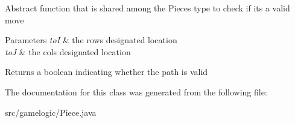 Abstract function that is shared among the Pieces type to check if it\textquotesingle{}s a valid move 
\begin{DoxyParams}{Parameters}
{\em toI} & the row\textquotesingle{}s designated location \\
\hline
{\em toJ} & the col\textquotesingle{}s designated location \\
\hline
\end{DoxyParams}
\begin{DoxyReturn}{Returns}
a boolean indicating whether the path is valid 
\end{DoxyReturn}


The documentation for this class was generated from the following file\+:\begin{DoxyCompactItemize}
\item 
src/gamelogic/Piece.\+java\end{DoxyCompactItemize}
